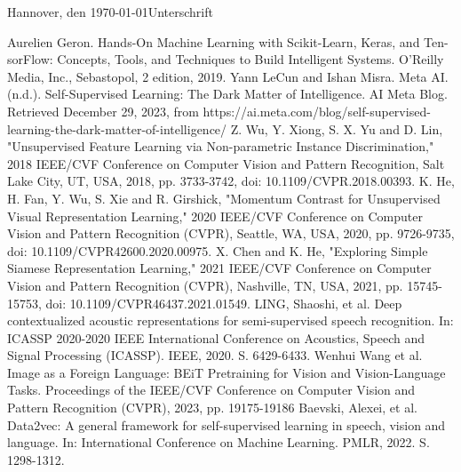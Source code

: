 \documentclass[fontsize=12pt,paper=a4,twoside=semi,parskip=half-,headsepline,headinclude]{scrreprt}
\begin{document}
Hannover, den \today \hfill Unterschrift
  \tableofcontents  %


\begin{thebibliography}{00}
   Aurelien Geron. Hands-On Machine Learning with Scikit-Learn, Keras, and Ten- sorFlow: Concepts, Tools, and Techniques to Build Intelligent Systems. O’Reilly Media, Inc., Sebastopol, 2 edition, 2019.
   Yann LeCun and Ishan Misra. Meta AI. (n.d.). Self-Supervised Learning: The Dark Matter of Intelligence. AI Meta Blog. Retrieved December 29, 2023, from https://ai.meta.com/blog/self-supervised-learning-the-dark-matter-of-intelligence/
   Z. Wu, Y. Xiong, S. X. Yu and D. Lin, "Unsupervised Feature Learning via Non-parametric Instance Discrimination," 2018 IEEE/CVF Conference on Computer Vision and Pattern Recognition, Salt Lake City, UT, USA, 2018, pp. 3733-3742, doi: 10.1109/CVPR.2018.00393.
   K. He, H. Fan, Y. Wu, S. Xie and R. Girshick, "Momentum Contrast for Unsupervised Visual Representation Learning," 2020 IEEE/CVF Conference on Computer Vision and Pattern Recognition (CVPR), Seattle, WA, USA, 2020, pp. 9726-9735, doi: 10.1109/CVPR42600.2020.00975.
   X. Chen and K. He, "Exploring Simple Siamese Representation Learning," 2021 IEEE/CVF Conference on Computer Vision and Pattern Recognition (CVPR), Nashville, TN, USA, 2021, pp. 15745-15753, doi: 10.1109/CVPR46437.2021.01549.
   LING, Shaoshi, et al. Deep contextualized acoustic representations for semi-supervised speech recognition. In: ICASSP 2020-2020 IEEE International Conference on Acoustics, Speech and Signal Processing (ICASSP). IEEE, 2020. S. 6429-6433.
   Wenhui Wang et al. Image as a Foreign Language: BEiT Pretraining for Vision and Vision-Language Tasks. Proceedings of the IEEE/CVF Conference on Computer Vision and Pattern Recognition (CVPR), 2023, pp. 19175-19186
   Baevski, Alexei, et al. Data2vec: A general framework for self-supervised learning in speech, vision and language. In: International Conference on Machine Learning. PMLR, 2022. S. 1298-1312.
\end{thebibliography}
\end{document}

